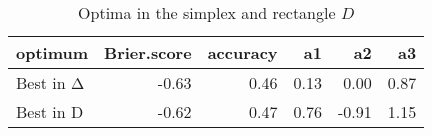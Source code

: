 \begin{table}[ht]
\centering
\begin{tabular}{lrrrrr}
  \hline
optimum & Brier.score & accuracy & a1 & a2 & a3 \\ 
  \hline
Best in Δ & -0.63 & 0.46 & 0.13 & 0.00 & 0.87 \\ 
  Best in D & -0.62 & 0.47 & 0.76 & -0.91 & 1.15 \\ 
   \hline
\end{tabular}
\caption{Optima in the simplex and rectangle $D$} 
\label{tab:step5}
\end{table}
